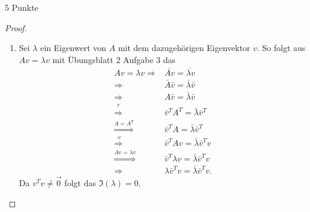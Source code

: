 \documentclass{problemset}
\begin{document}
\begin{problem}{5 Punkte}
\begin{proof}
\begin{enumerate}
        \item
              Sei \(\lambda\) ein Eigenwert von \(A\) mit dem dazugehörigen Eigenvektor \(v\).
              So folgt aus \(Av = \lambda v\) mit Übungsblatt 2 Aufgabe 3 das
              \begin{align*}
                  Av = \lambda v \Rightarrow            & \overline{Av} = \overline{\lambda v}             \\
                  \Rightarrow                           & \bar{A} \bar{v} = \bar{\lambda} \bar{v}          \\
                  \Rightarrow                           & A \bar{v} = \bar{\lambda} \bar{v}                \\
                  \overset{^T}{\Rightarrow}             & \bar{v}^T A^T = \bar{\lambda} \bar{v}^T          \\
                  \overset{A = A^T}{\Rightarrow}        & \bar{v}^T A = \bar{\lambda} \bar{v}^T            \\
                  \overset{\cdot v}{\Rightarrow}        & \bar{v}^T Av = \bar{\lambda} \bar{v}^T v         \\
                  \overset{Av = \lambda v}{\Rightarrow} & \bar{v}^T \lambda v = \bar{\lambda} \bar{v}^T v  \\
                  \Rightarrow                           & \lambda \bar{v}^T v = \bar{\lambda} \bar{v}^T v.
              \end{align*}
              Da \(v^Tv \neq \vec{0}\) folgt das \(\Im(\lambda) = 0\).
    \end{enumerate}
\end{proof}
\end{problem}
\end{document}
